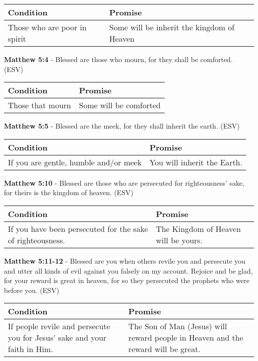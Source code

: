 \documentclass[11pt]{article}
\begin{document}
\begin{center}
\begin{tabular}{ll}
Condition & Promise\\[0pt]
\hline
Those who are poor in spirit & Some will be inherit the kingdom of Heaven\\[0pt]
\end{tabular}
\end{center}

\textbf{Matthew 5:4} - Blessed are those who mourn, for they shall be comforted. (ESV)

\begin{center}
\begin{tabular}{ll}
Condition & Promise\\[0pt]
\hline
Those that mourn & Some will be comforted\\[0pt]
\end{tabular}
\end{center}

\textbf{Matthew 5:5} - Blessed are the meek, for they shall inherit the earth. (ESV)

\begin{center}
\begin{tabular}{ll}
Condition & Promise\\[0pt]
\hline
If you are gentle, humble and/or meek & You will inherit the Earth.\\[0pt]
\end{tabular}
\end{center}

\textbf{Matthew 5:10} - Blessed are those who are persecuted for righteousness' sake, for theirs is the kingdom of heaven. (ESV)

\begin{center}
\begin{tabular}{ll}
Condition & Promise\\[0pt]
\hline
If you have been persecuted for the sake of righteousness. & The Kingdom of Heaven will be yours.\\[0pt]
\end{tabular}
\end{center}

\textbf{Matthew 5:11-12} - Blessed are you when others revile you and persecute you and utter all kinds of evil against you falsely on my account. Rejoice and be glad, for your reward is great in heaven, for so they persecuted the prophets who were before you. (ESV)

\begin{center}
\begin{tabular}{ll}
Condition & Promise\\[0pt]
\hline
If people revile and persecute you for Jesus' sake and your faith in Him. & The Son of Man (Jesus) will reward people in Heaven and the reward will be great.\\[0pt]
\end{tabular}
\end{center}
\end{document}
